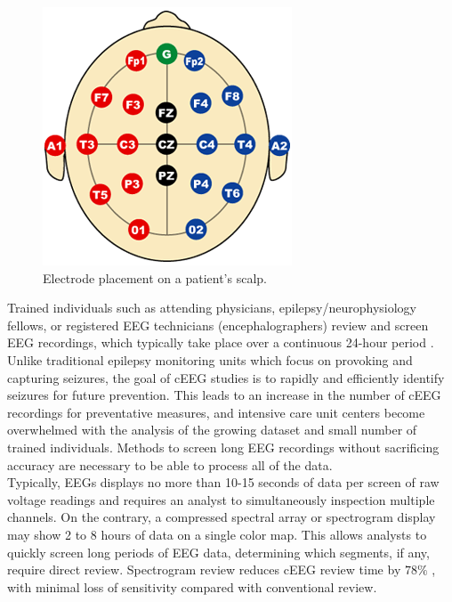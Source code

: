 \begin{figure}[h]
\begin{center}
\includegraphics[scale=0.5]{./img/electrodes.png}
\caption{Electrode placement on a patient's scalp.}
\label{fig:electrodes}
\end{center}
\end{figure}

Trained individuals such as attending physicians, epilepsy/neurophysiology
fellows, or registered EEG technicians (encephalographers) review and screen
EEG recordings, which typically take place over a continuous 24-hour period
\cite{ceeg-3}.  Unlike traditional epilepsy monitoring units which focus on
provoking and capturing seizures, the goal of cEEG studies is to rapidly and
efficiently identify seizures for future prevention. This leads to an increase
in the number of cEEG recordings for preventative measures, and intensive care
unit centers become overwhelmed with the analysis of the growing dataset and
small number of trained individuals. Methods to screen long EEG recordings
without sacrificing accuracy are necessary to be able to process all of the
data. \\

Typically, EEGs displays no more than 10-15 seconds of data per screen of raw
voltage readings and requires an analyst to simultaneously inspection multiple
channels. On the contrary, a compressed spectral array \cite{csa} or
spectrogram display may show 2 to 8 hours of data on a single color
map\cite{ceeg-3}. This allows analysts to quickly screen long periods of EEG
data, determining which segments, if any, require direct review. Spectrogram
review reduces cEEG review time by $78\%$ \cite{ceeg-2}, with minimal loss of
sensitivity compared with conventional review.\\

